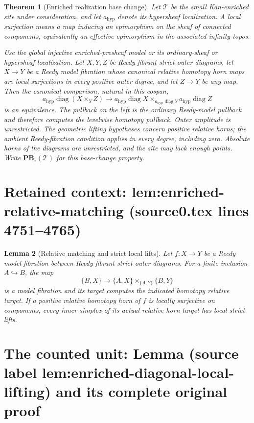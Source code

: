 \documentclass[10pt,a4paper]{amsart}
\theoremstyle{plain}
\newtheorem{thm}{Theorem}[section]
\newtheorem{lem}[thm]{Lemma}
\theoremstyle{definition}
\theoremstyle{remark}
\begin{document}
\begin{thm}[Enriched realization base change]
Let $\mathcal T$ be the small Kan-enriched site under
consideration, and let $a_{\mathrm{hyp}}$ denote its
hypersheaf localization.
\label{lem:derived-hypercomplete-base-change}
A \emph{local surjection} means
a map inducing an epimorphism on the sheaf of connected
components, equivalently an effective epimorphism in the
associated infinity-topos.

Use the global injective enriched-presheaf model or its
ordinary-sheaf or hypersheaf localization. Let $X,Y,Z$
be Reedy-fibrant strict outer diagrams, let $X\to Y$ be
a Reedy model fibration whose canonical relative homotopy
horn maps are local surjections in every positive outer
degree, and let $Z\to Y$ be any map. Then the canonical
comparison, natural in this cospan,
\[
 a_{\mathrm{hyp}}\operatorname{diag}(X\times_Y Z)
 \longrightarrow
 a_{\mathrm{hyp}}\operatorname{diag}X
 \times_{a_{\mathrm{hyp}}\operatorname{diag}Y}
 a_{\mathrm{hyp}}\operatorname{diag}Z
\]
is an equivalence. The pullback on the left is the ordinary
Reedy-model pullback and therefore computes the levelwise
homotopy pullback. Outer amplitude is unrestricted.
The geometric lifting hypotheses concern positive relative
horns; the ambient Reedy-fibration condition applies in
every degree, including zero. Absolute horns of the
diagrams are unrestricted, and the site may lack enough
points. Write $\mathbf{PB}_\tau(\mathcal T)$ for this
base-change property.
\end{thm}


\section*{Retained context: lem:enriched-relative-matching (source0.tex lines 4751--4765)}

\begin{lem}[Relative matching and strict local lifts]
Let $f:X\to Y$ be a Reedy model fibration between
Reedy-fibrant strict outer diagrams. For a finite inclusion
$A\hookrightarrow B$, the map
\[
 \{B,X\}\longrightarrow
 \{A,X\}\times_{\{A,Y\}}\{B,Y\}
\]
is a model fibration and its target computes the indicated
homotopy relative target.
\label{lem:enriched-relative-matching}
If a positive relative homotopy horn of $f$ is locally
surjective on components, every inner simplex of its
actual relative horn target has local strict lifts.
\end{lem}


\section{The counted unit: Lemma (source label lem:enriched-diagonal-local-lifting) and its complete original proof}
\end{document}
